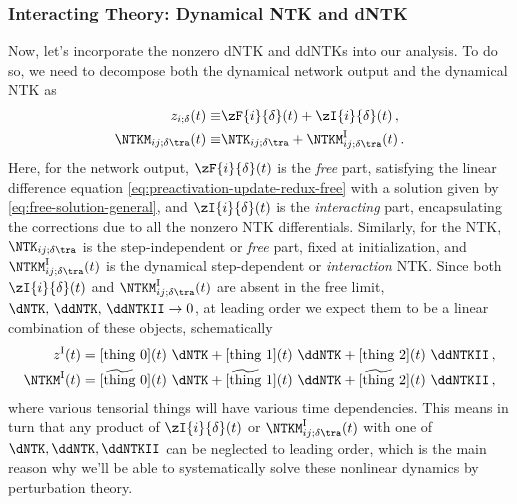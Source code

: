\subsubsection{Interacting Theory: Dynamical NTK and dNTK}
Now, let's incorporate the nonzero dNTK and ddNTKs into our analysis. To do so, we need to decompose both the dynamical network output and the dynamical NTK as
\begin{align}\label{eq:free-interaction-decomposition-it-is-physics}
z_{i;\delta}(t)\equiv& \zF{i}{\delta}(t)+\zI{i}{\delta}(t)\, , \\
\NTKM_{ij ;\delta\tra}(t) \equiv& \NTK_{ij;\delta\tra} + \NTKM^{\text{I}}_{ij ;\delta\tra}(t)  \, .
\label{eq:free-interaction-decomposition-for-NTK} 
\end{align}
Here, for the network output, $\zF{i}{\delta}(t)$ is the \emph{free} part, satisfying the linear difference equation \eqref{eq:preactivation-update-redux-free} with a solution given by \eqref{eq:free-solution-general}, and $\zI{i}{\delta}(t)$ is the \emph{interacting} part, encapsulating the corrections due to all the nonzero NTK differentials. Similarly, for the NTK, $\NTK_{ij;\delta\tra}$ is the step-independent or \emph{free} part, fixed at initialization, and $\NTKM^{\text{I}}_{ij ;\delta\tra}(t)$  is the dynamical step-dependent or \emph{interaction} NTK.
Since both $\zI{i}{\delta}(t)$ and $\NTKM^{\text{I}}_{ij ;\delta\tra}(t)$ are absent in the free limit,  $\dNTK,\, \ddNTK,\, \ddNTKII \to 0$, at leading order we expect them to be a linear combination of these objects, schematically
\begin{align}\label{eq:linear-combo}
z^{\text{I}}(t)  &= [\text{thing}\ 0](t)~ \dNTK + [\text{thing}\ 1](t)~ \ddNTK  + [\text{thing}\ 2](t)~ \ddNTKII  \, , \\
\NTKM^{\text{I}}(t)  &=  [\widetilde{\text{thing}}\ 0](t)~ \dNTK + [\widetilde{\text{thing}}\ 1](t)~ \ddNTK  + [\widetilde{\text{thing}}\ 2](t)~ \ddNTKII\, ,
\end{align}
where various tensorial things will have various time dependencies.
This  means in turn that any product of  $\zI{i}{\delta}(t)$ or $\NTKM^{\text{I}}_{ij ;\delta\tra}(t)$ with one of $ \dNTK, \ddNTK, \ddNTKII $ can be neglected to leading order, which is the main reason why we'll be able to systematically solve these nonlinear dynamics by perturbation theory.
